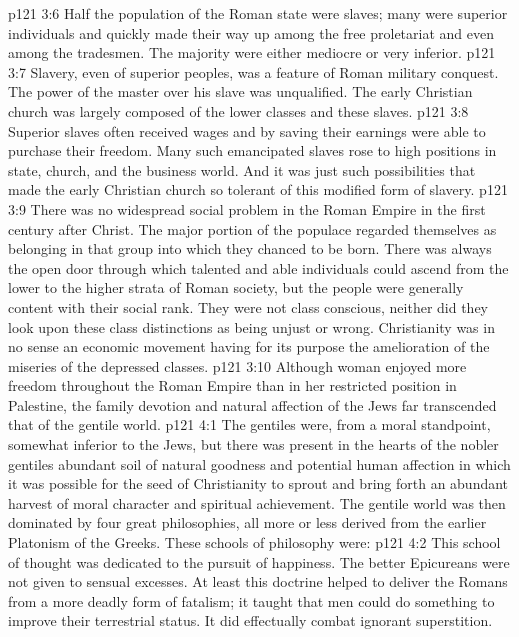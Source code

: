\pc \vs p121 3:6 \bibnobreakspace {} Half the population of the Roman state were slaves; many were superior individuals and quickly made their way up among the free proletariat and even among the tradesmen. The majority were either mediocre or very inferior.
\vs p121 3:7 Slavery, even of superior peoples, was a feature of Roman military conquest. The power of the master over his slave was unqualified. The early Christian church was largely composed of the lower classes and these slaves.
\vs p121 3:8 Superior slaves often received wages and by saving their earnings were able to purchase their freedom. Many such emancipated slaves rose to high positions in state, church, and the business world. And it was just such possibilities that made the early Christian church so tolerant of this modified form of slavery.
\pc \vs p121 3:9 There was no widespread social problem in the Roman Empire in the first century after Christ. The major portion of the populace regarded themselves as belonging in that group into which they chanced to be born. There was always the open door through which talented and able individuals could ascend from the lower to the higher strata of Roman society, but the people were generally content with their social rank. They were not class conscious, neither did they look upon these class distinctions as being unjust or wrong. Christianity was in no sense an economic movement having for its purpose the amelioration of the miseries of the depressed classes.\plusone
\vs p121 3:10 Although woman enjoyed more freedom throughout the Roman Empire than in her restricted position in Palestine, the family devotion and natural affection of the Jews far transcended that of the gentile world.
\vs p121 4:1 The gentiles were, from a moral standpoint, somewhat inferior to the Jews, but there was present in the hearts of the nobler gentiles abundant soil of natural goodness and potential human affection in which it was possible for the seed of Christianity to sprout and bring forth an abundant harvest of moral character and spiritual achievement. The gentile world was then dominated by four great philosophies, all more or less derived from the earlier Platonism of the Greeks. These schools of philosophy were:\plusone
\pc \vs p121 4:2 \bibnobreakspace {} This school of thought was dedicated to the pursuit of happiness. The better Epicureans were not given to sensual excesses. At least this doctrine helped to deliver the Romans from a more deadly form of fatalism; it taught that men could do something to improve their terrestrial status. It did effectually combat ignorant superstition.
